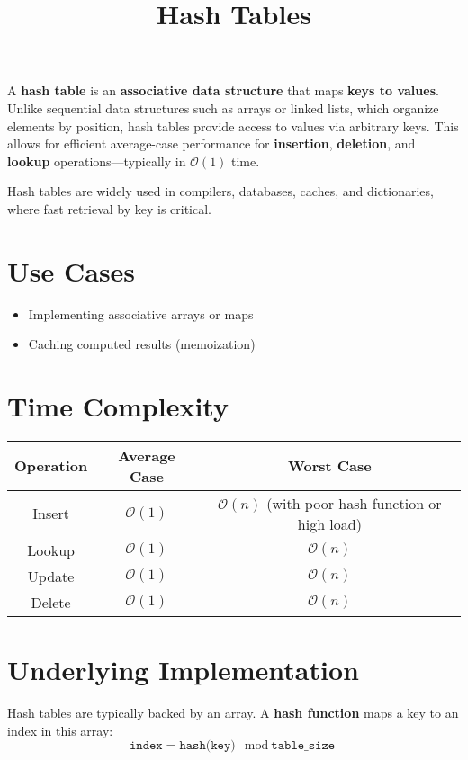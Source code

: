 \documentclass{article}
\title{Hash Tables}
\author{}
\date{}
\begin{document}
\maketitle

A \textbf{hash table} is an \textbf{associative data structure} that maps \textbf{keys to values}. Unlike sequential data structures such as arrays or linked lists, which organize elements by position, hash tables provide access to values via arbitrary keys. This allows for efficient average-case performance for \textbf{insertion}, \textbf{deletion}, and \textbf{lookup} operations—typically in $\mathcal{O}(1)$ time.

Hash tables are widely used in compilers, databases, caches, and dictionaries, where fast retrieval by key is critical.

\section{Use Cases}
\begin{itemize}
  \item Implementing associative arrays or maps
  \item Caching computed results (memoization)
\end{itemize}

\section{Time Complexity}
\begin{tabular}{|c|c|c|}
\hline
\textbf{Operation} & \textbf{Average Case} & \textbf{Worst Case} \\
\hline
Insert & $\mathcal{O}(1)$ & $\mathcal{O}(n)$ (with poor hash function or high load) \\
Lookup & $\mathcal{O}(1)$ & $\mathcal{O}(n)$ \\
Update & $\mathcal{O}(1)$ & $\mathcal{O}(n)$ \\
Delete & $\mathcal{O}(1)$ & $\mathcal{O}(n)$ \\
\hline
\end{tabular}

\section{Underlying Implementation}

Hash tables are typically backed by an array. A \textbf{hash function} maps a key to an index in this array:
\[
\texttt{index} = \texttt{hash(key)} \mod \texttt{table\_size}
\]
\end{document}
